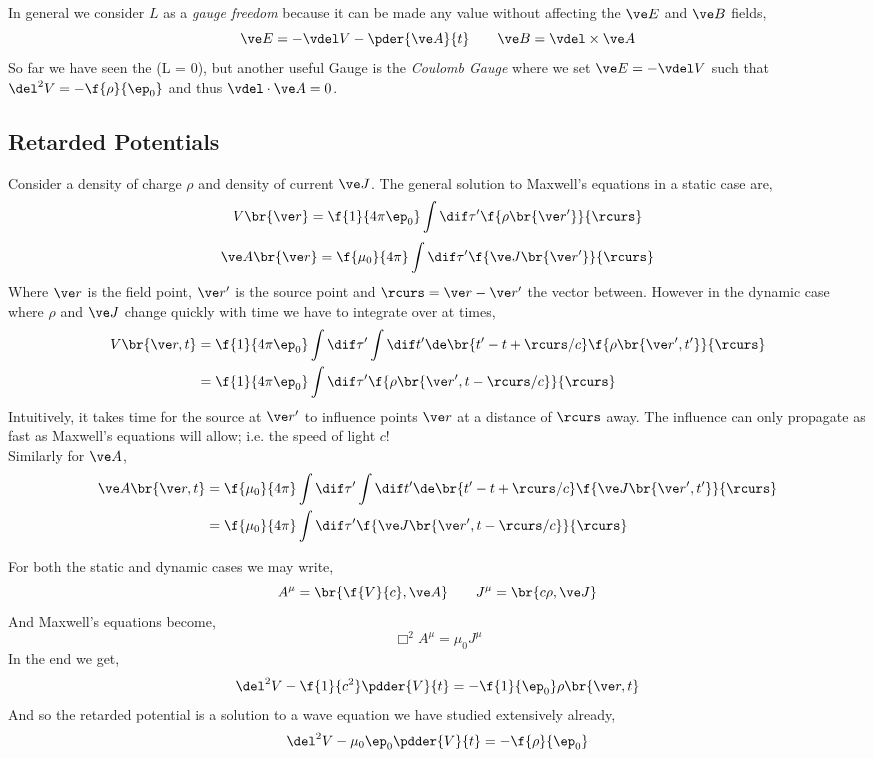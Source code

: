 \documentclass{article}
\begin{document}
In general we consider $L$ as a \textit{gauge freedom} because it can be made any value without affecting the $\ve E$ and $\ve B$ fields,
\[ \ve E = - \vdel V - \pder{\ve A}{t} \qquad \ve B = \vdel \times \ve A \]
So far we have seen the  (L = 0), but another useful Gauge is the \textit{Coulomb Gauge} where we set $\ve E= - \vdel V$ such that $\del^2 V = - \f{\rho}{\ep_0}$ and thus $\vdel \cdot \ve A = 0$. \\

\subsection{Retarded Potentials}

Consider a density of charge $\rho$ and density of current $\ve J$. The general solution to Maxwell's equations in a static case are,
\[ V\br{\ve r} = \f{1}{4 \pi \ep_0} \int \dif \tau' \f{\rho\br{\ve r'}}{\rcurs} \]
\[ \ve A\br{\ve r} = \f{\mu_0}{4 \pi} \int \dif \tau' \f{\ve J\br{\ve r'}}{\rcurs} \]
Where $\ve r$ is the field point, $\ve r'$ is the source point and $\rcurs = \ve r - \ve r'$ the vector between. However in the dynamic case where $\rho$ and $\ve J$ change quickly with time we have to integrate over at times,
\begin{align*}
V\br{\ve r, t}
&= \f{1}{4 \pi \ep_0} \int \dif \tau' \int \dif t' \de\br{t' - t + \rcurs / c}\f{\rho\br{\ve r', t'}}{\rcurs} \\
&= \f{1}{4 \pi \ep_0} \int \dif \tau'\f{\rho\br{\ve r', t - \rcurs / c}}{\rcurs}
\end{align*}
Intuitively, it takes time for the source at $\ve r'$ to influence points $\ve r$ at a distance of $\rcurs$ away. The influence can only propagate as fast as Maxwell's equations will allow; i.e. the speed of light $c$!\\
Similarly for $\ve A$,
\begin{align*}
\ve A\br{\ve r, t}
&= \f{\mu_0}{4 \pi} \int \dif \tau' \int \dif t' \de\br{t' - t + \rcurs / c}\f{\ve J\br{\ve r', t'}}{\rcurs} \\
&= \f{\mu_0}{4 \pi} \int \dif \tau'\f{\ve J\br{\ve r', t - \rcurs / c}}{\rcurs}
\end{align*}

For both the static and dynamic cases we may write,
\[ A^{\mu} = \br{\f{V}{c}, \ve A} \qquad J^{\mu} = \br{c \rho, \ve J} \]
And Maxwell's equations become,
\[ \Box^2 A^{\mu} = \mu_0 J^{\mu} \]
In the end we get,
\[ \del^2 V - \f{1}{c^2} \pdder{V}{t} = - \f{1}{\ep_0} \rho\br{\ve r, t} \]
And so the retarded potential is a solution to a wave equation we have studied extensively already,
\[ \del^2 V - \mu_0 \ep_0 \pdder{V}{t} = - \f{\rho}{\ep_0} \]
\end{document}
